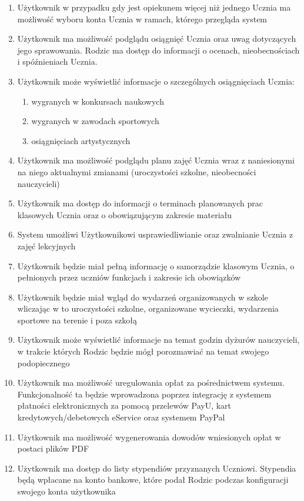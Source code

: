\documentclass{article}
\begin{document}
\begin{enumerate}
	\item Użytkownik w przypadku gdy jest opiekunem więcej niż jednego Ucznia ma możliwość wyboru konta Ucznia w ramach, którego przegląda system
	\item Użytkownik ma możliwość podglądu osiągnięć Ucznia oraz uwag dotyczących jego sprawowania. Rodzic ma dostęp do informacji o ocenach, nieobecnościach i spóźnieniach Ucznia.
	\item Użytkownik może wyświetlić informacje o szczególnych osiągnięciach Ucznia:
	\begin{enumerate}
		\item wygranych w konkursach naukowych
		\item wygranych w zawodach sportowych
		\item osiągnięciach artystycznych
	\end{enumerate}
	\item Użytkownik ma możliwość podglądu planu zajęć Ucznia wraz z naniesionymi na niego aktualnymi zmianami (uroczystości szkolne, nieobecności nauczycieli)
	\item Użytkownik ma dostęp do informacji o terminach planowanych prac klasowych Ucznia oraz o obowiązującym zakresie materiału
	\item System umożliwi Użytkownikowi usprawiedliwianie oraz zwalnianie Ucznia z zajęć lekcyjnych
	\item Użytkownik będzie miał pełną informację o samorządzie klasowym Ucznia, o pełnionych przez uczniów funkcjach i zakresie ich obowiązków
	\item Użytkownik będzie miał wgląd do wydarzeń organizowanych w szkole wliczając w to uroczystości szkolne, organizowane wycieczki, wydarzenia sportowe na terenie i poza szkołą
	\item Użytkownik może wyświetlić informacje na temat godzin dyżurów nauczycieli, w trakcie których Rodzic będzie mógł porozmawiać na temat swojego podopiecznego
	\item Użytkownik ma możliwość uregulowania opłat za pośrednictwem systemu. Funkcjonalność ta będzie wprowadzona poprzez integrację z systemem płatności elektronicznych za pomocą przelewów PayU, kart kredytowych/debetowych eService oraz systemem PayPal
	\item Użytkownik ma możliwość wygenerowania dowodów wniesionych opłat w postaci plików PDF
	\item Użytkownik ma dostęp do listy stypendiów przyznanych Uczniowi. Stypendia będą wpłacane na konto bankowe, które podał Rodzic podczas konfiguracji swojego konta użytkownika

\end{enumerate}
\end{document}
